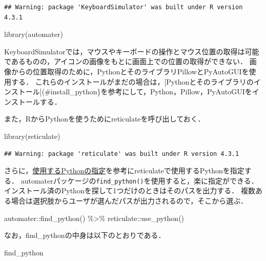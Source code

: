 \documentclass[
]{article}
\newenvironment{Shaded}{\begin{snugshade}}{\end{snugshade}}
\newcommand{\FunctionTok}[1]{\textcolor[rgb]{0.00,0.00,0.00}{#1}}
\newcommand{\NormalTok}[1]{#1}
\newcommand{\SpecialCharTok}[1]{\textcolor[rgb]{0.00,0.00,0.00}{#1}}
\begin{document}
\begin{verbatim}
## Warning: package 'KeyboardSimulator' was built under R version 4.3.1
\end{verbatim}

\begin{Shaded}
\begin{Highlighting}[]
\FunctionTok{library}\NormalTok{(automater)}
\end{Highlighting}
\end{Shaded}

KeyboardSimulatorでは，マウスやキーボードの操作とマウス位置の取得は可能であるものの，アイコンの画像をもとに画面上での位置の取得ができない．
画像からの位置取得のために，PythonとそのライブラリPillowとPyAutoGUIを使用する．
これらのインストールがまだの場合は，{[}Pythonとそのライブラリのインストール{]}(\#install\_python\}を参考にして，Python，Pillow，PyAutoGUIをインストールする．

また，RからPythonを使うためにreticulateを呼び出しておく．

\begin{Shaded}
\begin{Highlighting}[]
\FunctionTok{library}\NormalTok{(reticulate)}
\end{Highlighting}
\end{Shaded}

\begin{verbatim}
## Warning: package 'reticulate' was built under R version 4.3.1
\end{verbatim}

さらに，\protect\hyperlink{identify_python}{使用するPythonの指定}を参考にreticulateで使用するPythonを指定する．
automaterパッケージの\texttt{find\_python()}を使用すると，楽に指定ができる．
インストール済のPythonを探して1つだけのときはそのパスを出力する．
複数ある場合は選択肢からユーザが選んだパスが出力されるので，そこから選ぶ．

\begin{Shaded}
\begin{Highlighting}[]
\NormalTok{automater}\SpecialCharTok{::}\FunctionTok{find\_python}\NormalTok{() }\SpecialCharTok{\%\textgreater{}\%}
\NormalTok{  reticulate}\SpecialCharTok{::}\FunctionTok{use\_python}\NormalTok{()}
\end{Highlighting}
\end{Shaded}

なお，find\_pythonの中身は以下のとおりである．

\begin{Shaded}
\begin{Highlighting}[]
\NormalTok{find\_python}
\end{Highlighting}
\end{Shaded}
\end{document}
